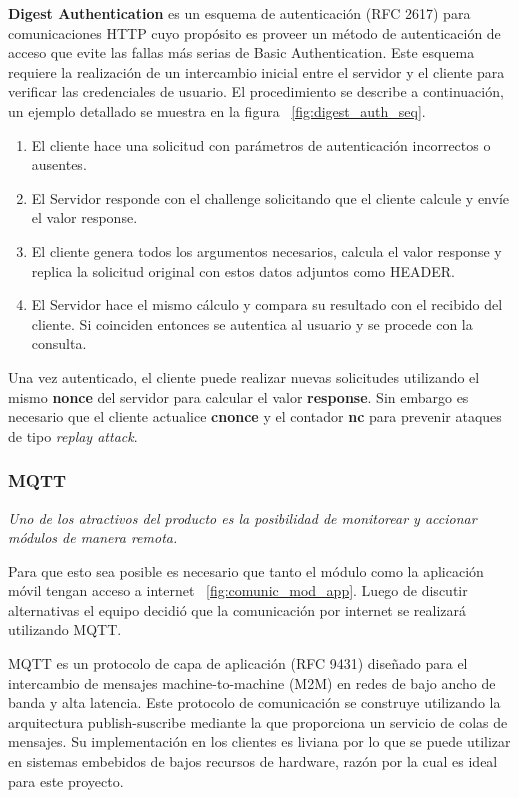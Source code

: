 \textbf{Digest Authentication} es un esquema de autenticación (RFC 2617) para comunicaciones HTTP cuyo propósito es proveer un método de autenticación de acceso que evite las fallas más serias de Basic Authentication.
Este esquema requiere la realización de un intercambio inicial entre el servidor y el cliente para verificar las credenciales de usuario. El procedimiento se describe a continuación, un ejemplo detallado se muestra en la figura ~\ref{fig:digest_auth_seq}.
\begin{enumerate}
	\item El cliente hace una solicitud con parámetros de autenticación incorrectos o ausentes.
	\item El Servidor responde con el challenge solicitando que el cliente calcule y envíe el valor  response.
	\item El cliente genera todos los argumentos necesarios, calcula el valor response y replica la solicitud original con estos datos adjuntos como HEADER.
	\item El Servidor hace el mismo cálculo y compara su resultado con el recibido del cliente. Si coinciden entonces se autentica al usuario y se procede con la consulta.
\end{enumerate}

Una vez autenticado, el cliente puede realizar nuevas solicitudes utilizando el mismo \textbf{nonce} del servidor para calcular el valor \textbf{response}. Sin embargo es necesario que el cliente actualice \textbf{cnonce} y el contador \textbf{nc} para prevenir ataques de tipo \emph{replay attack}. 

\subsubsection{MQTT}
\label{section:mqtt}
\emph{Uno de los atractivos del producto es la posibilidad de monitorear y accionar módulos de manera remota.}

Para que esto sea posible es necesario que tanto el módulo como la aplicación móvil tengan acceso a internet ~\ref{fig:comunic_mod_app}. Luego de discutir alternativas el equipo decidió que la comunicación por internet se realizará utilizando  MQTT.

MQTT es un protocolo de capa de aplicación (RFC 9431) diseñado para el intercambio de mensajes machine-to-machine (M2M) en redes de bajo ancho de banda y alta latencia. Este protocolo de comunicación se construye utilizando la arquitectura publish-suscribe mediante la que proporciona un servicio de colas de mensajes. Su implementación en los clientes es liviana por lo que se puede utilizar en sistemas embebidos de bajos recursos de hardware, razón por la cual es ideal para este proyecto.

